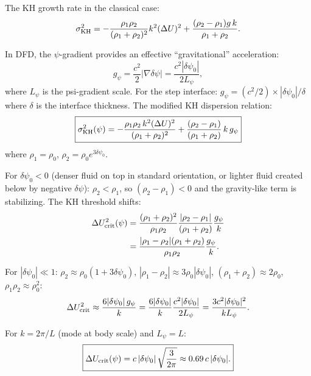 \documentclass[11pt,twocolumn]{article}
\newcommand{\dpsi}{\delta\psi}
\begin{document}
The KH growth rate in the classical case:
\begin{equation}
\sigma_{\rm KH}^2 = -\frac{\rho_1\rho_2}{(\rho_1+\rho_2)^2}k^2(\Delta U)^2
+ \frac{(\rho_2 - \rho_1)g\,k}{\rho_1 + \rho_2}.
\label{eq:kh_classical}
\end{equation}

In DFD, the $\psi$-gradient provides an effective ``gravitational'' acceleration:
\begin{equation}
g_\psi = \frac{c^2}{2}|\nabla\dpsi| = \frac{c^2|\dpsi_0|}{2L_\psi},
\label{eq:g_psi}
\end{equation}
where $L_\psi$ is the psi-gradient scale. For the step interface:
$g_\psi = (c^2/2)\times|\dpsi_0|/\delta$ where $\delta$ is the interface
thickness. The modified KH dispersion relation:
\begin{equation}
\boxed{
\sigma_{\rm KH}^2(\psi) = -\frac{\rho_1\rho_2\,k^2(\Delta U)^2}{(\rho_1+\rho_2)^2}
+ \frac{(\rho_2-\rho_1)}{(\rho_1+\rho_2)}\,k\,g_\psi
}
\label{eq:kh_dfd}
\end{equation}
where $\rho_1 = \rho_0$, $\rho_2 = \rho_0 e^{3\dpsi_0}$.

For $\dpsi_0 < 0$ (denser fluid on top in standard orientation, or
lighter fluid created below by negative $\dpsi$):
$\rho_2 < \rho_1$, so $(\rho_2 - \rho_1) < 0$ and the gravity-like
term is stabilizing. The KH threshold shifts:
\begin{align}
\Delta U_{\rm crit}^2(\psi) &= \frac{(\rho_1+\rho_2)^2}{\rho_1\rho_2}
\frac{|\rho_2-\rho_1|}{(\rho_1+\rho_2)}\frac{g_\psi}{k}
\nonumber\\
&= \frac{|\rho_1 - \rho_2|(\rho_1+\rho_2)}{\rho_1\rho_2}\frac{g_\psi}{k}.
\label{eq:deltau_crit}
\end{align}

For $|\dpsi_0| \ll 1$: $\rho_2 \approx \rho_0(1 + 3\dpsi_0)$,
$|\rho_1 - \rho_2| \approx 3\rho_0|\dpsi_0|$,
$(\rho_1+\rho_2) \approx 2\rho_0$, $\rho_1\rho_2 \approx \rho_0^2$:
\begin{equation}
\Delta U_{\rm crit}^2 \approx \frac{6|\dpsi_0|\,g_\psi}{k}
= \frac{6|\dpsi_0|}{k}\frac{c^2|\dpsi_0|}{2L_\psi}
= \frac{3c^2|\dpsi_0|^2}{kL_\psi}.
\label{eq:deltau_crit_small}
\end{equation}

For $k = 2\pi/L$ (mode at body scale) and $L_\psi = L$:
\begin{equation}
\boxed{
\Delta U_{\rm crit}(\psi) = c\,|\dpsi_0|\,\sqrt{\frac{3}{2\pi}}
\approx 0.69\,c\,|\dpsi_0|.
}
\label{eq:deltau_final}
\end{equation}
\end{document}
